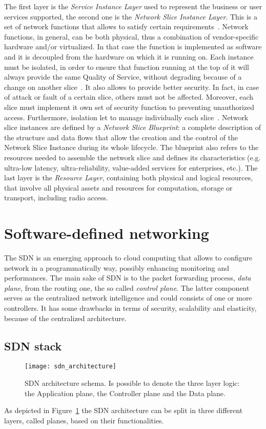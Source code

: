 The first layer is the \emph{Service Instance Layer} used to represent the
business or user services supported, the second one is the \emph{Network Slice
Instance Layer}. This is a set of network functions that allows to
satisfy certain requirements~\cite{kotulski2017end}. Network functions, in
general, can be both physical, thus a combination of vendor-specific hardware
and/or virtualized. In that case the function is implemented as software and it
is decoupled from the hardware on which it is running on. Each instance must be
isolated, in order to ensure that function running at the top of it will always
provide the same Quality of Service, without degrading because of a change on
another slice~\cite{richart2016resource}. It also allows to provide better 
security. In fact, in case of attack or fault of a certain slice, others must 
not be affected. Moreover, each slice must implement it own set of security 
function to preventing unauthorized access. Furthermore, isolation let to manage 
individually each slice~\cite{ordonez2017network}. Network slice instances are 
defined by a \emph{Network Slice Blueprint}: a complete description of the 
structure and data flows that allow the creation and the control of the Network 
Slice Instance during its whole lifecycle. The blueprint also refers to the 
resources needed to assemble the network slice and defines its characteristics 
(e.g. ultra-low latency, ultra-reliability, value-added services for 
enterprises, etc.). The last layer is the \emph{Resource Layer}, containing both 
physical and logical resources, that involve all physical assets and resources 
for computation, storage or transport, including radio access. 




\section{Software-defined networking}
The SDN is an emerging approach to cloud computing that allows to configure
network in a programmatically way, possibly enhancing monitoring and
performances. The main sake of SDN is to the packet forwarding process,
\emph{data plane}, from the routing one, the so called \emph{control plane}.
The latter component serves as the centralized network intelligence and could
consists of one or more controllers. It has some drawbacks in terms of
security, scalability and elasticity, because of the centralized architecture.

\subsection{SDN stack}
\begin{figure}[ht]
 \centering
 \texttt{[image: sdn\_architecture]}
 \caption[SDN architecture schema]{SDN architecture schema. Is possible to 
denote the three layer logic: the Application plane, the Controller plane and 
the Data plane.}
 \label{chap:background:img:sdn_architecture}
\end{figure}
As depicted in Figure~\ref{chap:background:img:sdn_architecture} the SDN
architecture can be split in three different layers, called planes, based on 
their functionalities. 

